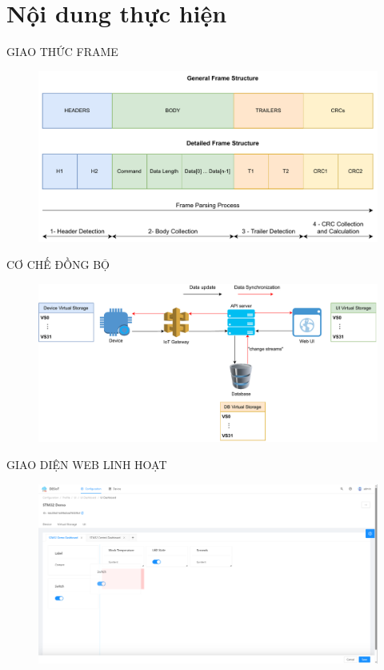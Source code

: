 \section{Nội dung thực hiện}

\begin{frame}{GIAO THỨC FRAME}
    \begin{figure}
    	\centering
    	\includegraphics[width=1.0\textwidth,height=.8\textheight]{pic/Presentation-Page-2-Frame-Structure-Overview.pdf}
    \end{figure}
\end{frame}

\begin{frame}{CƠ CHẾ ĐỒNG BỘ}
    \begin{figure}
    	\centering
    	\includegraphics[width=1.0\textwidth]{pic/Presentation-Page-3-sync-mecha.pdf}
    \end{figure}
\end{frame}

\begin{frame}{GIAO DIỆN WEB LINH HOẠT}
    \begin{figure}
    	\centering
    	\includegraphics[width=1.0\textwidth,height=0.8\textheight]{pic/fig-config-ui-tab-edit-mode.png}
    \end{figure}
\end{frame}

